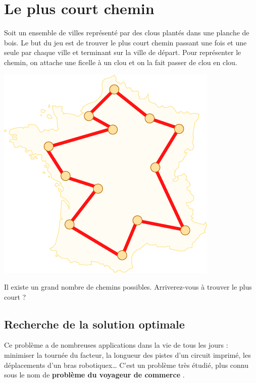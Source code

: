 \chapter*{Le plus court chemin}

Soit un ensemble de villes représenté par des clous plantés dans une planche de
bois. Le but du jeu est de trouver le plus court chemin passant une fois et une
seule par chaque ville et terminant sur la ville de départ. Pour représenter le
chemin, on attache une ficelle à un clou et on la fait passer de clou en clou.

\begin{center}
  \includegraphics[width=0.5\linewidth]{img/tsp.pdf}
  \label{img:tsp}
\end{center}


Il existe un grand nombre de chemins possibles. Arriverez-vous à trouver le plus
court ?

\newpage

\section*{Recherche de la solution optimale}

Ce problème a de nombreuses applications dans la vie de tous les jours :
minimiser la tournée du facteur, la longueur des pistes d'un circuit imprimé,
les déplacements d'un bras robotiquex{\ldots} C'est un problème très étudié,
plus connu sous le nom de \textbf{\og problème du voyageur de commerce \fg}.

